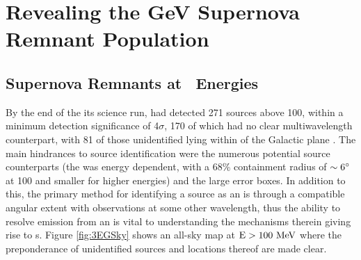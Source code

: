 \chapter{Revealing the GeV Supernova Remnant Population}
\label{chap:snrCat}


\section{\label{snrCat:latGam}Supernova Remnants at \gam~Energies}

By the end of the its science run, \egret{} had detected 271 sources above 100\mev{}, within a minimum detection significance of 4$\sigma$, 170 of which had no clear multiwavelength counterpart, with 81 of those unidentified lying within \blat of the Galactic plane \citep{Hartman99}. The main hindrances to source identification were the numerous potential source counterparts (the \egret{} \psf{} was energy dependent, with a 68\% containment radius of ${\rm \sim 6 ^\circ}$ at 100\mev{} and smaller for higher energies) and the large \egret{} error boxes. In addition to this, the primary method for identifying a \gam{} source as an \snr{} is through a compatible angular extent with  observations at some other wavelength, thus the ability to resolve emission from an \snr{} is vital to understanding the mechanisms therein giving rise to \gam{}s. Figure \ref{fig:3EGSky} shows an \egret{} all-sky map at ${\rm E > 100 ~\mathrm{MeV}}$ where the preponderance of unidentified sources and locations thereof are made clear.  


